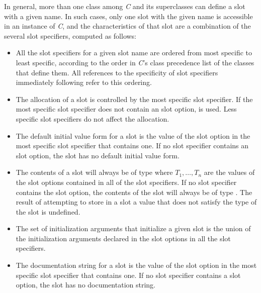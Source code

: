 In general, more than one class among \emph{C} and its superclasses can
define a slot with a given name.  In such cases, only one slot with
the given name is accessible in an instance of \emph{C}, and
the characteristics of that slot are a combination of the several slot
specifiers, computed as follows:

\begin{itemize}

\item All the slot specifiers for a given slot name are ordered
from most specific to least specific, according to the order in \emph{C}'s
class precedence list of the classes that define them. All references
to the specificity of slot specifiers immediately following refer to this
ordering.

\item The allocation of a slot is controlled by the most specific
slot specifier.  If the most specific slot specifier does not contain an
 slot option,  is used.  Less specific
slot specifiers do not affect the allocation.

\item The default initial value form for a
slot is the value of the  slot option in the most
specific slot specifier that contains one.  If no slot specifier
contains an  slot option, the slot has no default
initial value form.

\item The contents of a slot will always be of type 
where $T_1, \ldots, T_{n}$ are
the values of the  slot options contained in all of the slot
specifiers.  If no slot specifier contains the  slot option, the
contents of the slot will always be of type . The result
of attempting to store in a slot
a value that does not satisfy the type of the slot is undefined.

\item The set of initialization arguments that initialize a given
slot is the union of the initialization arguments declared in the 
 slot options in all the slot specifiers.

\item The documentation string for a slot is the value of the
 slot option in the most specific slot specifier
that contains one.  If no slot specifier contains a 
 slot option, the slot has no documentation string.
\end{itemize}

